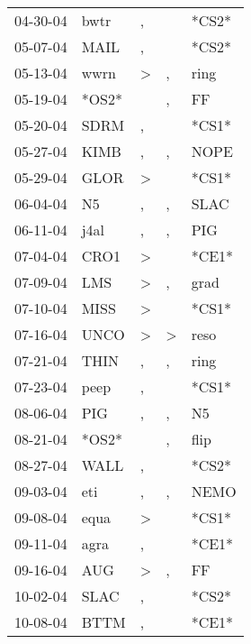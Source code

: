 \begin{supertabular}{lllll}
 04-30-04 &   bwtr &                , &                  &  *CS2* \\
 05-07-04 &   MAIL &                , &                  &  *CS2* \\
 05-13-04 &   wwrn &     \textgreater &                , &   ring \\
 05-19-04 &  *OS2* &                  &                , &     FF \\
 05-20-04 &   SDRM &                , &                  &  *CS1* \\
 05-27-04 &   KIMB &                , &                , &   NOPE \\
 05-29-04 &   GLOR &     \textgreater &                  &  *CS1* \\
 06-04-04 &     N5 &                , &                , &   SLAC \\
 06-11-04 &   j4al &                , &                , &    PIG \\
 07-04-04 &   CRO1 &     \textgreater &                  &  *CE1* \\
 07-09-04 &    LMS &     \textgreater &                , &   grad \\
 07-10-04 &   MISS &     \textgreater &                  &  *CS1* \\
 07-16-04 &   UNCO &     \textgreater &     \textgreater &   reso \\
 07-21-04 &   THIN &                , &                , &   ring \\
 07-23-04 &   peep &                , &                  &  *CS1* \\
 08-06-04 &    PIG &                , &                , &     N5 \\
 08-21-04 &  *OS2* &                  &                , &   flip \\
 08-27-04 &   WALL &                , &                  &  *CS2* \\
 09-03-04 &    eti &                , &                , &   NEMO \\
 09-08-04 &   equa &     \textgreater &                  &  *CS1* \\
 09-11-04 &   agra &                , &                  &  *CE1* \\
 09-16-04 &    AUG &     \textgreater &                , &     FF \\
 10-02-04 &   SLAC &                , &                  &  *CS2* \\
 10-08-04 &   BTTM &                , &                  &  *CE1* \\

\end{supertabular}
